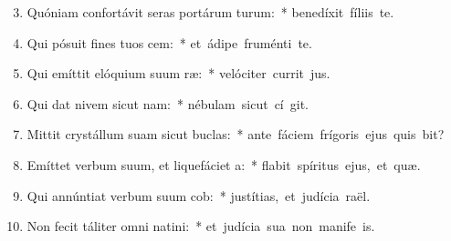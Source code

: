 \begin{flushleft}
\begin{enumerate}[leftmargin=*]
\setcounter{enumi}{2}

\item Quóniam confortávit seras portárum turum:~* \mbox{benedíxit fíliis   te.}
\item Qui pósuit fines tuos cem:~* \mbox{et ádipe fruménti  te.}
\item Qui emíttit elóquium suum ræ:~* \mbox{velóciter currit  jus.}
\item Qui dat nivem sicut nam:~* \mbox{nébulam sicut cí git.}
\item Mittit crystállum suam sicut buclas:~* \mbox{ante fáciem frígoris ejus quis bit?}
\item Emíttet verbum suum, et liquefáciet a:~* \mbox{flabit spíritus ejus, et  quæ.}
\item Qui annúntiat verbum suum cob:~* \mbox{justítias, et judícia  raël.}
\item Non fecit táliter omni natini:~* \mbox{et judícia sua non manife is.}

\end{enumerate}
\end{flushleft}

